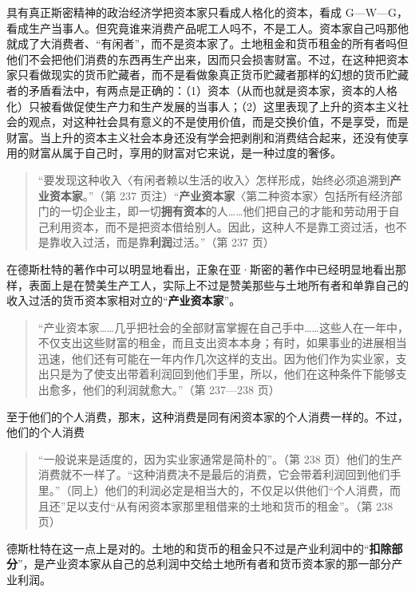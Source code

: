 \fontbox{~\{}具有真正斯密精神的政治经济学把资本家只看成人格化的资本，看成 G—W—G，看成生产当事人。但究竟谁来消费产品呢工人吗不，不是工人。资本家自己吗那他就成了大消费者、“有闲者”，而不是资本家了。土地租金和货币租金的所有者吗但他们不会把他们消费的东西再生产出来，因而只会损害财富。不过，在这种把资本家只看做现实的货币贮藏者，而不是看做象真正货币贮藏者那样的幻想的货币贮藏者的矛盾看法中，有两点是正确的：（1）资本（从而也就是资本家，资本的人格化）只被看做促使生产力和生产发展的当事人；（2）这里表现了上升的资本主义社会的观点，对这种社会具有意义的不是使用价值，而是交换价值，不是享受，而是财富。当上升的资本主义社会本身还没有学会把剥削和消费结合起来，还没有使享用的财富从属于自己时，享用的财富对它来说，是一种过度的奢侈。\fontbox{\}~}

\begin{quote}“要发现这种收入〈有闲者赖以生活的收入〉怎样形成，始终必须追溯到\textbf{产业资本家}。”（第 237 页注）“\textbf{产业资本家}〈第二种资本家〉包括所有经济部门的一切企业主，即一切\textbf{拥有资本}的人……他们把自己的才能和劳动用于自己利用资本，而不是把资本借给别人。因此，这种人不是靠工资过活，也不是靠收入过活，而是靠\textbf{利润}过活。”（第 237 页）\end{quote}

在德斯杜特的著作中可以明显地看出，正象在亚·斯密的著作中已经明显地看出那样，表面上是在赞美生产工人，实际上不过是赞美那些与土地所有者和单靠自己的收入过活的货币资本家相对立的“\textbf{产业资本家}”。

\begin{quote}“产业资本家……几乎把社会的全部财富掌握在自己手中……这些人在一年中，不仅支出这些财富的租金，而且支出资本本身；有时，如果事业的进展相当迅速，他们还有可能在一年内作几次这样的支出。因为他们作为实业家，支出只是为了使支出带着利润回到他们手里，所以，他们在这种条件下能够支出愈多，他们的利润就愈大。”（第 237—238 页）\end{quote}

至于他们的个人消费，那末，这种消费是同有闲资本家的个人消费一样的。不过，他们的个人消费

\begin{quote}“一般说来是适度的，因为实业家通常是简朴的”。（第 238 页）他们的生产消费就不一样了。“这种消费决不是最后的消费，它会带着利润回到他们手里。”（同上）他们的利润必定是相当大的，不仅足以供他们“个人消费，而且还”足以支付“从有闲资本家那里租借来的土地和货币的租金”。（第 238 页）\end{quote}

德斯杜特在这一点上是对的。土地的和货币的租金只不过是产业利润中的“\textbf{扣除部分}”，是产业资本家从自己的总利润中交给土地所有者和货币资本家的那一部分产业利润。

